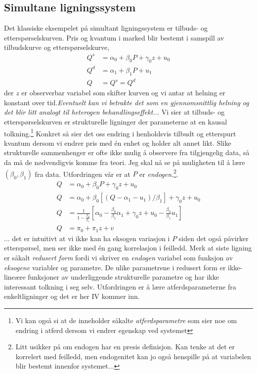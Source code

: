 \subsection{Simultane ligningssystem}
Det klassiske eksempelet på simultant ligningssystem er tilbuds- og etterspørselskurven. Pris og kvantum i marked blir bestemt i samspill av tilbudskurve og etterspørselskurve,
\begin{align}
Q^s &= \alpha_0+\beta_0 P + \gamma_0 z + u_0 \\
Q^d &= \alpha_1+\beta_1 P + u_1 \\
Q &= Q^s=Q^d
\end{align}
der $z$ er observerbar variabel som skifter kurven og vi antar at helning er konstant over tid.\textit{Eventuelt kan vi betrakte det som en gjennomsnittlig helning og det blir litt analogt til heterogen behandlingseffekt...} Vi sier at tilbuds- og etterspørselskurven er strukturelle ligninger der parameterne at en kausal tolkning.\footnote{Vi kan også si at de inneholder såkalte \textit{atferdsparametre} som sier noe om endring i atferd dersom vi endrer egenskap ved systemet} Konkret så sier det oss endring i henholdsvis tilbudt og etterspurt kvantum dersom vi endrer pris med én enhet og holder alt annet likt. Slike strukturelle sammenhenger er ofte ikke mulig å observere fra tilgjengelig data, så da må de nødvendigvis komme fra teori. Jeg skal nå se på muligheten til å lære $(\beta_0, \beta_1)$ fra data. Utfordringen vår er at $P$ er \textit{endogen}.\footnote{Litt usikker på om endogen har en presis definisjon. Kan tenke at det er korrelert med feilledd, men endogenitet kan jo også henspille på at variabelen blir bestemt innenfor systemet...}. 
\begin{align}
Q &= \alpha_0+\beta_0 P + \gamma_0 z + u_0 \\
Q &= \alpha_0+\beta_0 [(Q-\alpha_1 - u_1)/\beta_1] + \gamma_0 z + u_0 \\
Q &= \frac{1}{1-\frac{\beta_0}{\beta_1}}\left[ \alpha_0 -\frac{\beta_0}{\beta_1}\alpha_1 + \gamma_0 z + u_0 - \frac{\beta_0}{\beta_1}u_1\right] \\
Q &= \pi_0 + \pi_1z + v
\end{align}
... det er intuitivt at vi ikke kan ha eksogen variasjon i $P$ siden det også påvirker etterspørsel, men ser ikke med én gang korrelasjon i feilledd. Merk at siste ligning er såkalt \textit{redusert form} fordi vi skriver en \textit{endogen} variabel som funksjon av \textit{eksogene} variabler og parametre. De ulike parametrene i redusert form er ikke-lineære funksjoner av underliggende strukturelle parametre og har ikke interessant tolkning i seg selv. Utfordringen er å lære atferdsparameterne fra enkeltligninger og det er her IV kommer inn.

